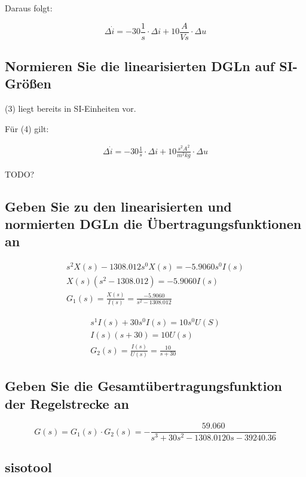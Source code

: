 \documentclass[a4paper,10pt,left=1.5cm,right=1.5cm,top=1.5cm,bottom=1.5cm]{article}
\begin{document}
Daraus folgt:

\begin{equation}
  \Delta \dot{i} = -30 \frac{1}{s} \cdot \Delta i + 10 \frac{A}{Vs} \cdot \Delta u
\end{equation}

\subsection{Normieren Sie die linearisierten DGLn auf SI-Größen}

(3) liegt bereits in SI-Einheiten vor.

Für (4) gilt:

\begin{eqnarray}
  \Delta \dot{i} = -30 \frac{1}{s} \cdot \Delta i + 10 \frac{s^2 A^2}{m^2 kg} \cdot \Delta u
\end{eqnarray}

TODO?

\subsection{Geben Sie zu den linearisierten und normierten DGLn die Übertragungsfunktionen an}

\begin{eqnarray*}
  s^2 X(s) - 1308.012 s^0 X(s) = -5.9060 s^0 I(s) \\
  X(s)(s^2 - 1308.012) = -5.9060 I(s) \\
  G_1(s) = \frac{X(s)}{I(s)} = \frac{-5.9060}{s^2 - 1308.012}
\end{eqnarray*}

\begin{eqnarray*}
  s^1 I(s) + 30 s^0 I(s) = 10 s^0 U(S) \\
  I(s)(s + 30) = 10 U(s) \\
  G_2(s) = \frac{I(s)}{U(s)} = \frac{10}{s + 30} 
\end{eqnarray*}

\subsection{Geben Sie die Gesamtübertragungsfunktion der Regelstrecke an}

\begin{equation}
  G(s) = G_1(s) \cdot G_2(s) = - \frac{59.060}{s^3 + 30 s^2 - 1308.0120 s - 39240.36}
\end{equation}

\subsection{sisotool}
\end{document}
